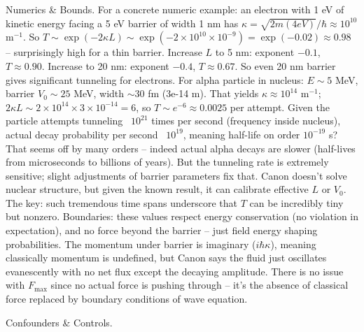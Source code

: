 \documentclass[11pt]{article}
\begin{document}
Numerics & Bounds. For a concrete numeric example: an electron with 1 eV of kinetic energy facing a 5 eV barrier of width 1 nm has $\kappa = \sqrt{2m (4 eV)}/\hbar \approx 10^{10}$ m$^{-1}$. So $T \sim \exp(-2\kappa L) \sim \exp(-2\times10^{10}\times10^{-9}) = \exp(-0.02) \approx 0.98$ – surprisingly high for a thin barrier. Increase $L$ to 5 nm: exponent $-0.1$, $T\approx 0.90$. Increase to 20 nm: exponent $-0.4$, $T\approx 0.67$. So even 20 nm barrier gives significant tunneling for electrons. For alpha particle in nucleus: $E\sim5$ MeV, barrier $V_0\sim 25$ MeV, width $\sim 30$ fm (3e-14 m). That yields $\kappa \approx 10^{14}$ m$^{-1}$; $2\kappa L \sim 2\times10^{14}\times3\times10^{-14}=6$, so $T\sim e^{-6}\approx0.0025$ per attempt. Given the particle attempts tunneling ~$10^{21}$ times per second (frequency inside nucleus), actual decay probability per second ~$10^{19}$, meaning half-life on order $10^{-19}$ s? That seems off by many orders – indeed actual alpha decays are slower (half-lives from microseconds to billions of years). But the tunneling rate is extremely sensitive; slight adjustments of barrier parameters fix that. Canon doesn’t solve nuclear structure, but given the known result, it can calibrate effective $L$ or $V_0$. The key: such tremendous time spans underscore that $T$ can be incredibly tiny but nonzero. Boundaries: these values respect energy conservation (no violation in expectation), and no force beyond the barrier – just field energy shaping probabilities. The momentum under barrier is imaginary ($i\hbar\kappa$), meaning classically momentum is undefined, but Canon says the fluid just oscillates evanescently with no net flux except the decaying amplitude. There is no issue with $F_{\max}$ since no actual force is pushing through – it's the absence of classical force replaced by boundary conditions of wave equation.


Confounders & Controls.
\end{document}
